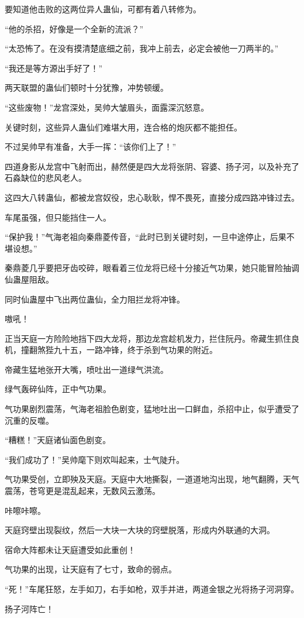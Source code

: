 \begin{this_body}
要知道他击败的这两位异人蛊仙，可都有着八转修为。

“他的杀招，好像是一个全新的流派？”

“太恐怖了。在没有摸清楚底细之前，我冲上前去，必定会被他一刀两半的。”

“我还是等方源出手好了！”

两天联盟的蛊仙们顿时十分犹豫，冲势顿缓。

“这些废物！”龙宫深处，吴帅大皱眉头，面露深沉怒意。

关键时刻，这些异人蛊仙们难堪大用，连合格的炮灰都不能担任。

不过吴帅早有准备，大手一挥：“该你们上了！”

四道身影从龙宫中飞射而出，赫然便是四大龙将张阴、容婆、扬子河，以及补充了石淼缺位的悲风老人。

这四大八转蛊仙，都被龙宫奴役，忠心耿耿，悍不畏死，直接分成四路冲锋过去。

车尾虽强，但只能挡住一人。

“保护我！”气海老祖向秦鼎菱传音，“此时已到关键时刻，一旦中途停止，后果不堪设想。”

秦鼎菱几乎要把牙齿咬碎，眼看着三位龙将已经十分接近气功果，她只能冒险抽调仙蛊屋阻敌。

同时仙蛊屋中飞出两位蛊仙，全力阻拦龙将冲锋。

嗷吼！

正当天庭一方险险地挡下四大龙将，那边龙宫趁机发力，拦住阮丹。帝藏生抓住良机，撞翻煞狴九十五，一路冲锋，终于杀到气功果的附近。

帝藏生猛地张开大嘴，喷吐出一道绿气洪流。

绿气轰碎仙阵，正中气功果。

气功果剧烈震荡，气海老祖脸色剧变，猛地吐出一口鲜血，杀招中止，似乎遭受了沉重的反噬。

“糟糕！”天庭诸仙面色剧变。

“我们成功了！”吴帅麾下则欢叫起来，士气陡升。

气功果受创，立即殃及天庭。天庭中大地撕裂，一道道地沟出现，地气翻腾，天气震荡，苍穹更是混乱起来，无数风云激荡。

咔嚓咔嚓。

天庭窍壁出现裂纹，然后一大块一大块的窍壁脱落，形成内外联通的大洞。

宿命大阵都未让天庭遭受如此重创！

气功果的出现，让天庭有了七寸，致命的弱点。

“死！”车尾狂怒，左手如刀，右手如枪，双手并进，两道金银之光将扬子河洞穿。

扬子河阵亡！


\end{this_body}

